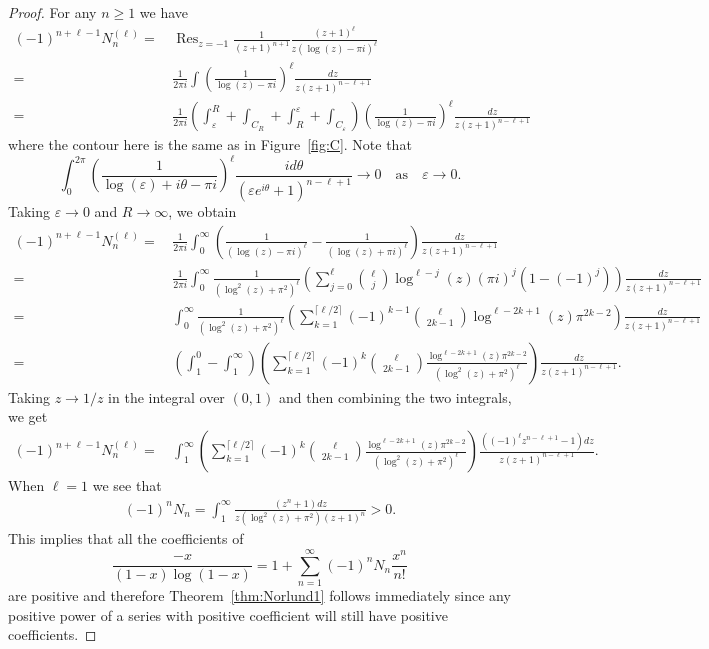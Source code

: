 \documentclass[11pt]{article}
\newcommand\eps{{\varepsilon}}
\DeclareMathOperator{\Res}{Res}
\theoremstyle{plain}
\theoremstyle{definition}
\begin{document}
\begin{proof}
For any $n\ge 1$ we have
\begin{align*}
(-1)^{n+\ell-1}  N_n^{(\ell)} = &\, \Res_{z=-1} \frac{1}{(z+1)^{n+1}}  \frac{(z+1)^\ell}{z(\log(z)-\pi i)^\ell} \\
=&\, \frac{1}{2\pi i} \int  \left(\frac{1}{\log(z)-\pi i}\right)^\ell \frac{dz}{z(z+1)^{n-\ell+1}}\\
=&\, \frac{1}{2\pi i}\left( \int_\eps^R +\int_{C_R}+\int_R^\eps+ \int_{C_\eps} \right) \left(\frac{1}{\log(z)-\pi i}\right)^\ell \frac{dz}{z(z+1)^{n-\ell+1}}
\end{align*}
where the contour here is the same as in Figure~\ref{fig:C}. Note that
\begin{equation*}
     \int_0^{2\pi}  \left(\frac{1}{\log(\varepsilon)+i\theta-\pi i}\right)^\ell \frac{i d\theta}{(\varepsilon e^{i\theta}+1)^{n-\ell+1}} \to 0 \quad\text{as}\quad \varepsilon \to 0.
\end{equation*}
Taking $\eps\to 0$ and $R\to \infty$, we obtain
\begin{align*}
(-1)^{n+\ell-1}  N_n^{(\ell)} =&\, \frac{1}{2\pi i}  \int_0^\infty  \left(\frac{1}{(\log(z)-\pi i)^\ell}- \frac{1}{(\log(z)+\pi i)^\ell}\right) \frac{dz}{z(z+1)^{n-\ell+1}}\\
=&\,    \frac{1}{2\pi i} \int_0^\infty  \frac{1}{(\log^2(z)+\pi^2)^\ell} \left( \sum_{j=0}^\ell \binom{\ell}{j}  \log^{\ell-j}(z)(\pi i)^j(1-(-1)^j) \right)\frac{dz}{z(z+1)^{n-\ell+1}}\\
=&\,    \int_0^\infty  \frac{1}{(\log^2(z)+\pi^2)^\ell} \left( \sum_{k=1}^{\lceil \ell/2\rceil} (-1)^{k-1} \binom{\ell}{2k-1}
                                            \log^{\ell-2k+1}(z) \pi^{2k-2}  \right)\frac{dz}{z(z+1)^{n-\ell+1}}\\
=&\,    \left( \int_1^0-\int_1^\infty \right)   \left( \sum_{k=1}^{\lceil \ell/2\rceil} (-1)^k \binom{\ell}{2k-1}
                                         \frac{\log^{\ell-2k+1}(z) \pi^{2k-2}}{(\log^2(z)+\pi^2)^\ell} \right)\frac{dz}{z(z+1)^{n-\ell+1}}.
\end{align*}
Taking $z\to 1/z$ in the integral over $(0,1)$ and then combining the two integrals, we get
\begin{align*}
(-1)^{n+\ell-1}  N_n^{(\ell)}
=&\,     \int_1^\infty   \left( \sum_{k=1}^{\lceil \ell/2\rceil} (-1)^k \binom{\ell}{2k-1}
               \frac{\log^{\ell-2k+1}(z) \pi^{2k-2}}{(\log^2(z)+\pi^2)^\ell}  \right)\frac{((-1)^{\ell} z^{n-\ell+1}-1)dz}{z(z+1)^{n-\ell+1}}.
\end{align*}
When $\ell=1$ we see that
\begin{align*}
(-1)^{n} N_n  = \int_1^\infty   \frac{( z^{n}+1)dz}{z(\log^2(z)+\pi^2)(z+1)^{n}} >0.
\end{align*}
This implies that all the coefficients of
\begin{equation*}
\frac{-x}{(1-x)\log(1-x)}=1+\sum_{n=1}^\infty (-1)^{n} N_n \frac{x^n}{n!}
\end{equation*}
are positive and therefore Theorem~\ref{thm:Norlund1} follows immediately since any positive power of a series with positive coefficient will still have positive coefficients.
\end{proof}
\end{document}
